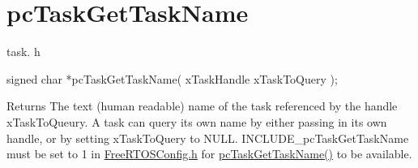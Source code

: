 \hypertarget{group__pcTaskGetTaskName}{}\section{pc\+Task\+Get\+Task\+Name}
\label{group__pcTaskGetTaskName}
task. h 
\begin{DoxyPre}signed char *pcTaskGetTaskName( xTaskHandle xTaskToQuery );\end{DoxyPre}


\begin{DoxyReturn}{Returns}
The text (human readable) name of the task referenced by the handle x\+Task\+To\+Queury. A task can query its own name by either passing in its own handle, or by setting x\+Task\+To\+Query to N\+U\+LL. I\+N\+C\+L\+U\+D\+E\+\_\+pc\+Task\+Get\+Task\+Name must be set to 1 in \hyperlink{FreeRTOSConfig_8h}{Free\+R\+T\+O\+S\+Config.\+h} for \hyperlink{task_8h_a9f1840f3a1d2527e76d301fc1a6aba37}{pc\+Task\+Get\+Task\+Name()} to be available. 
\end{DoxyReturn}
